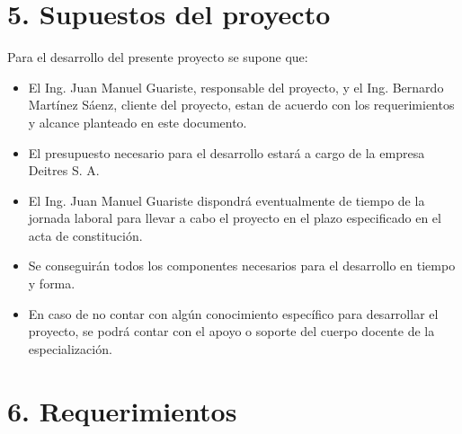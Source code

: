 \documentclass[
11pt, %
]{charter}
\begin{document}
\section{5. Supuestos del proyecto}
\label{sec:supuestos}


Para el desarrollo del presente proyecto se supone que: 

\begin{itemize}
	\item El Ing. Juan Manuel Guariste, responsable del proyecto, y el Ing. Bernardo Martínez Sáenz, cliente del proyecto, estan de acuerdo con los requerimientos y 		alcance planteado en este documento.
	\item El presupuesto necesario para el desarrollo estará a cargo de la empresa Deitres S. A.
	\item El Ing. Juan Manuel Guariste dispondrá eventualmente de tiempo de la jornada laboral para llevar a cabo el proyecto en el plazo especificado en el acta de constitución.
	\item Se conseguirán todos los componentes necesarios para el desarrollo en tiempo y forma.	
	\item En caso de no contar con algún conocimiento específico para desarrollar el proyecto, se podrá contar con el apoyo o soporte del cuerpo docente de la especialización.
\end{itemize}

\pagebreak

\section{6. Requerimientos}
\label{sec:requerimientos}
\end{document}
